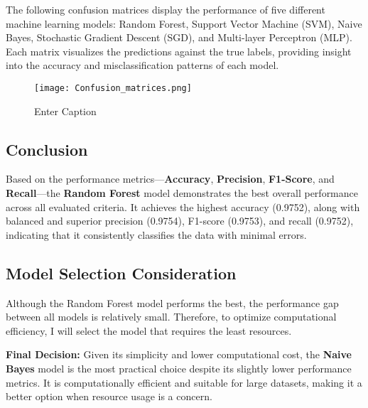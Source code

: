 \documentclass{article}
\begin{document}
The following confusion matrices display the performance of five different machine learning models: Random Forest, Support Vector Machine (SVM), Naive Bayes, Stochastic Gradient Descent (SGD), and Multi-layer Perceptron (MLP). Each matrix visualizes the predictions against the true labels, providing insight into the accuracy and misclassification patterns of each model.

\begin{figure}[H]
    \centering
    \texttt{[image: Confusion\_matrices.png]}
    \caption{Enter Caption}
    \label{fig:enter-label}
\end{figure}

\subsection{Conclusion}

Based on the performance metrics—\textbf{Accuracy}, \textbf{Precision}, \textbf{F1-Score}, and \textbf{Recall}—the \textbf{Random Forest} model demonstrates the best overall performance across all evaluated criteria. It achieves the highest accuracy (0.9752), along with balanced and superior precision (0.9754), F1-score (0.9753), and recall (0.9752), indicating that it consistently classifies the data with minimal errors.

\subsection{Model Selection Consideration}

Although the Random Forest model performs the best, the performance gap between all models is relatively small. Therefore, to optimize computational efficiency, I will select the model that requires the least resources.

\textbf{Final Decision:} Given its simplicity and lower computational cost, the \textbf{Naive Bayes} model is the most practical choice despite its slightly lower performance metrics. It is computationally efficient and suitable for large datasets, making it a better option when resource usage is a concern.
\end{document}
